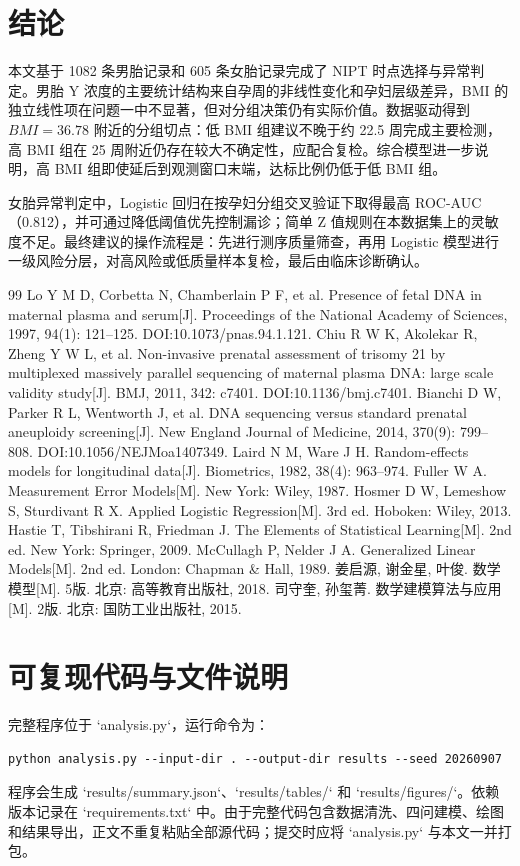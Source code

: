 \documentclass[UTF8,a4paper,12pt]{ctexart}
\begin{document}
\section{结论}

本文基于 1082 条男胎记录和 605 条女胎记录完成了 NIPT 时点选择与异常判定。男胎 Y 浓度的主要统计结构来自孕周的非线性变化和孕妇层级差异，BMI 的独立线性项在问题一中不显著，但对分组决策仍有实际价值。数据驱动得到 $BMI=36.78$ 附近的分组切点：低 BMI 组建议不晚于约 22.5 周完成主要检测，高 BMI 组在 25 周附近仍存在较大不确定性，应配合复检。综合模型进一步说明，高 BMI 组即使延后到观测窗口末端，达标比例仍低于低 BMI 组。

女胎异常判定中，Logistic 回归在按孕妇分组交叉验证下取得最高 ROC-AUC（0.812），并可通过降低阈值优先控制漏诊；简单 Z 值规则在本数据集上的灵敏度不足。最终建议的操作流程是：先进行测序质量筛查，再用 Logistic 模型进行一级风险分层，对高风险或低质量样本复检，最后由临床诊断确认。

\begin{thebibliography}{99}
 Lo Y M D, Corbetta N, Chamberlain P F, et al. Presence of fetal DNA in maternal plasma and serum[J]. Proceedings of the National Academy of Sciences, 1997, 94(1): 121--125. DOI:10.1073/pnas.94.1.121.
 Chiu R W K, Akolekar R, Zheng Y W L, et al. Non-invasive prenatal assessment of trisomy 21 by multiplexed massively parallel sequencing of maternal plasma DNA: large scale validity study[J]. BMJ, 2011, 342: c7401. DOI:10.1136/bmj.c7401.
 Bianchi D W, Parker R L, Wentworth J, et al. DNA sequencing versus standard prenatal aneuploidy screening[J]. New England Journal of Medicine, 2014, 370(9): 799--808. DOI:10.1056/NEJMoa1407349.
 Laird N M, Ware J H. Random-effects models for longitudinal data[J]. Biometrics, 1982, 38(4): 963--974.
 Fuller W A. Measurement Error Models[M]. New York: Wiley, 1987.
 Hosmer D W, Lemeshow S, Sturdivant R X. Applied Logistic Regression[M]. 3rd ed. Hoboken: Wiley, 2013.
 Hastie T, Tibshirani R, Friedman J. The Elements of Statistical Learning[M]. 2nd ed. New York: Springer, 2009.
 McCullagh P, Nelder J A. Generalized Linear Models[M]. 2nd ed. London: Chapman \& Hall, 1989.
 姜启源, 谢金星, 叶俊. 数学模型[M]. 5版. 北京: 高等教育出版社, 2018.
 司守奎, 孙玺菁. 数学建模算法与应用[M]. 2版. 北京: 国防工业出版社, 2015.
\end{thebibliography}

\appendix
\section{可复现代码与文件说明}

完整程序位于 `analysis.py`，运行命令为：
\begin{verbatim}
python analysis.py --input-dir . --output-dir results --seed 20260907
\end{verbatim}
程序会生成 `results/summary.json`、`results/tables/` 和 `results/figures/`。依赖版本记录在 `requirements.txt` 中。由于完整代码包含数据清洗、四问建模、绘图和结果导出，正文不重复粘贴全部源代码；提交时应将 `analysis.py` 与本文一并打包。
\end{document}
